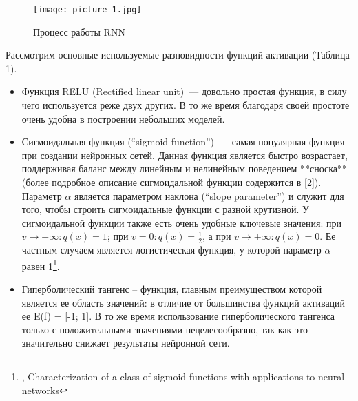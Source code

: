 \documentclass[12pt, a4paper]{article}
\begin{document}
\begin{figure}[h]
    \centering
    \texttt{[image: picture\_1.jpg]}
		\caption{Процесс работы RNN}
\end{figure}

Рассмотрим основные используемые разновидности функций активации (Таблица 1).
\begin{itemize}
\item Функция RELU (Rectified linear unit)~--- довольно простая функция, в силу чего используется реже двух других. В то же время благодаря своей простоте очень удобна в построении небольших моделей.
\item	Сигмоидальная функция (“sigmoid function”)~--- самая популярная функция при создании нейронных сетей. Данная функция является быстро возрастает, поддерживая баланс между линейным и нелинейным поведением **сноска** (более подробное описание сигмоидальной функции содержится в [2]). Параметр $\alpha$  является параметром наклона (“slope parameter”) и служит для того, чтобы строить сигмоидальные функции с разной крутизной. У сигмоидальной функции также есть очень удобные ключевые значения: при $v \to -\infty: q(x) = 1$; при $v = 0: q(x) = \frac{1}{2}$, а при $v \to +\infty: q(x) = 0$. Ее частным случаем является логистическая функция, у которой параметр $\alpha$ равен 1\footnote{\cite{Sigmoid}, Characterization of a class of sigmoid functions with applications to neural networks}.
\item	Гиперболический тангенс – функция, главным преимуществом которой является ее область значений: в отличие от большинства функций активаций ее E(f) = [-1; 1]. В то же время использование гиперболического тангенса только с положительными значениями нецелесообразно, так как это значительно снижает результаты нейронной сети. \\
\end{itemize}
\end{document}
